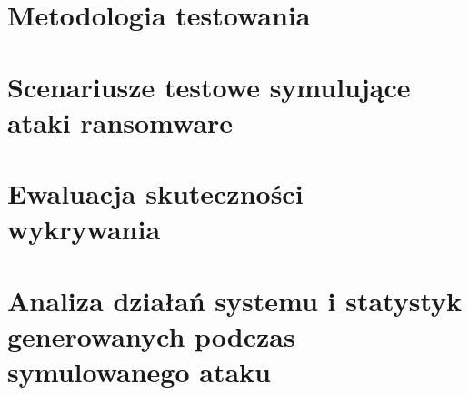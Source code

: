 \section{Metodologia testowania}
\section{Scenariusze testowe symulujące ataki ransomware}
\section{Ewaluacja skuteczności wykrywania}
\section{Analiza działań systemu i statystyk generowanych podczas symulowanego ataku}